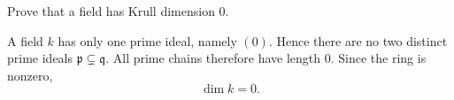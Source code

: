 \begin{problem}\label{prob:vi29-03}
Prove that a field has Krull dimension \(0\).

\end{problem}

\ifdefined\FullProblemDossiers
\begin{solution}
A field \(k\) has only one prime ideal, namely \((0)\).  Hence there are no two distinct prime ideals
\(\mathfrak p\subsetneq\mathfrak q\).  All prime chains therefore have length \(0\).  Since the ring is nonzero,
\[
\boxed{\dim k=0}.
\]
\end{solution}
\fi
